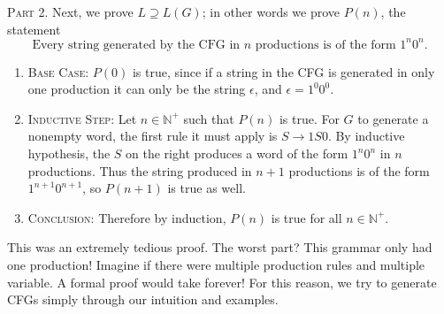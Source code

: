 \documentclass{article}
\begin{document}
    \vspace{1.5mm}
    \textsc{Part 2.} Next, we prove $L \supseteq L(G)$; in other words we prove $P(n)$, the statement $$\text{Every string generated by the CFG in $n$ productions is of the form $1^{n}0^{n}$.}$$
    \begin{enumerate} [label = {}, nosep, leftmargin = .25in]
        \item \textsc{Base Case:} $P(0)$ is true, since if a string in the CFG is generated in only one production it can only be the string $\epsilon$, and $\epsilon = 1^{0}0^{0}$.
    
        \vspace{2mm}
        \item \textsc{Inductive Step:} Let $n \in \mathbb{N}^{+}$ such that $P(n)$ is true. For $G$ to generate a nonempty word, the first rule it must apply is $S \rightarrow 1S0$. By inductive hypothesis, the $S$ on the right produces a word of the form $1^{n}0^{n}$ in $n$ productions. Thus the string produced in $n + 1$ productions is of the form $1^{n + 1}0^{n + 1}$, so $P(n + 1)$ is true as well.
        
        \vspace{2mm}
        \item \textsc{Conclusion:} Therefore by induction, $P(n)$ is true for all $n \in \mathbb{N}^{+}$.
    \end{enumerate}
    
    This was an extremely tedious proof. The worst part? This grammar only had one production! Imagine if there were multiple production rules and multiple variable. A formal proof would take forever! For this reason, we try to generate CFGs simply through our intuition and examples.
    
\end{document}

